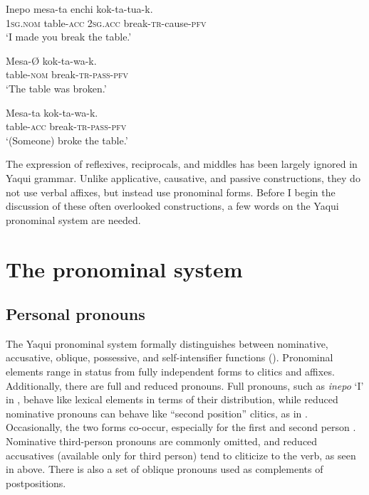 \documentclass[output=paper]{langscibook}
\begin{document}
\ea%
    \label{ex:guerrero:5}
 \ea
 \label{ex:guerrero:5a}
\gll Inepo    mesa-ta  enchi    kok-ta-tua-k.\\
  \textsc{1sg.nom}    table-\textsc{acc}  2\textsc{sg.acc}    break-\textsc{tr-}cause\textsc{{}-pfv}\\
\glt ‘I made you break the table.’

\ex
\label{ex:guerrero:5b}
\gll Mesa-Ø  kok-ta-wa-k.\\
  table-\textsc{nom}  break-\textsc{tr-pass-pfv}\\
\glt ‘The table was broken.’

\ex
\label{ex:guerrero:5c}
\gll Mesa-ta  kok-ta-wa-k.\\
  table-\textsc{acc}  break-\textsc{tr-pass-pfv}\\
\glt ‘(Someone) broke the table.’
\z
\z



The expression of reflexives, reciprocals, and middles has been largely ignored in Yaqui grammar. Unlike applicative, causative, and passive constructions, they do not use verbal affixes, but instead use pronominal forms. Before I begin the discussion of these often overlooked constructions, a few words on the Yaqui pronominal system are needed.

\section{The pronominal system}\label{sec:guerrero:2}



\subsection{Personal pronouns}\label{sec:guerrero:2.1}



The Yaqui pronominal system formally distinguishes between nominative, accusative, oblique, possessive, and self-intensifier functions (). Pronominal elements range in status from fully independent forms to clitics and affixes. Additionally, there are full and reduced pronouns. Full pronouns, such as \textit{inepo} ‘I’ in , behave like lexical elements in terms of their distribution, while reduced nominative pronouns can behave like “second position” clitics, as in . Occasionally, the two forms co-occur, especially for the first and second person . Nominative third-person pronouns are commonly omitted, and reduced accusatives (available only for third person) tend to cliticize to the verb, as seen in  above. There is also a set of oblique pronouns used as complements of postpositions.
\end{document}
